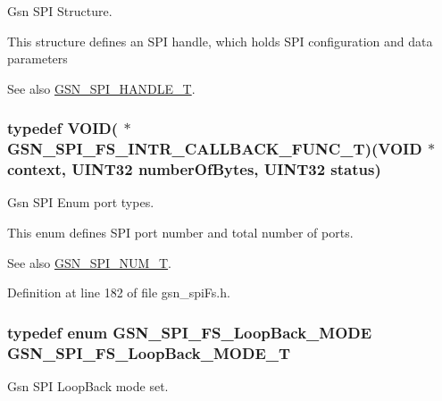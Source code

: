 Gsn SPI Structure. 

This structure defines an SPI handle, which holds SPI configuration and data parameters

\begin{DoxySeeAlso}{See also}
\hyperlink{a00655_ga046c33438e29676344675866f7935308}{GSN\_\-SPI\_\-HANDLE\_\-T}. 
\end{DoxySeeAlso}
\hypertarget{a00655_gaccc2e6d52833a5b6d9bbdd2506521d89}{
\subsubsection[{GSN\_\-SPI\_\-FS\_\-INTR\_\-CALLBACK\_\-FUNC\_\-T}]{\setlength{\rightskip}{0pt plus 5cm}typedef VOID( $\ast$ {\bf GSN\_\-SPI\_\-FS\_\-INTR\_\-CALLBACK\_\-FUNC\_\-T})(VOID $\ast$context, {\bf UINT32} numberOfBytes, {\bf UINT32} status)}}
\label{a00655_gaccc2e6d52833a5b6d9bbdd2506521d89}


Gsn SPI Enum port types. 

This enum defines SPI port number and total number of ports. \begin{DoxySeeAlso}{See also}
\hyperlink{a00587_a8158d263babcdfe1b3b113e23acd1bf7}{GSN\_\-SPI\_\-NUM\_\-T}. 
\end{DoxySeeAlso}


Definition at line 182 of file gsn\_\-spiFs.h.

\hypertarget{a00655_ga721139ec14f269f577231293b4b96dad}{
\subsubsection[{GSN\_\-SPI\_\-FS\_\-LoopBack\_\-MODE\_\-T}]{\setlength{\rightskip}{0pt plus 5cm}typedef enum {\bf GSN\_\-SPI\_\-FS\_\-LoopBack\_\-MODE}  {\bf GSN\_\-SPI\_\-FS\_\-LoopBack\_\-MODE\_\-T}}}
\label{a00655_ga721139ec14f269f577231293b4b96dad}


Gsn SPI LoopBack mode set. 


